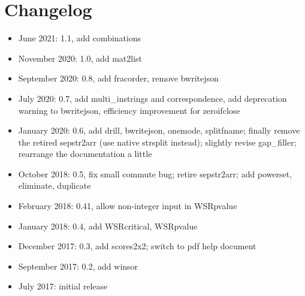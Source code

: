 \documentclass[11pt,english]{article}
\begin{document}
\section{Changelog }
\begin{itemize}
\item June 2021: 1.1, add combinations
\item November 2020: 1.0, add mat2list
\item September 2020: 0.8, add fracorder, remove bwritejson
\item July 2020: 0.7, add multi\_instrings and correspondence, add deprecation warning to
bwritejson, efficiency improvement for zeroifclose
\item January 2020: 0.6, add drill, bwritejson, onemode, splitfname;
  finally remove the retired sepstr2arr (use native strsplit instead);
  slightly revise gap\_filler; rearrange the documentation a little
\item October 2018: 0.5, fix small commute bug; retire sepstr2arr; add powerset,
  eliminate, duplicate
\item February 2018: 0.41, allow non-integer input in WSRpvalue
\item January 2018: 0.4, add WSRcritical, WSRpvalue
\item December 2017: 0.3, add scores2x2; switch to pdf help document
\item September 2017: 0.2, add winsor
\item July 2017: initial release
\end{itemize}
\end{document}

